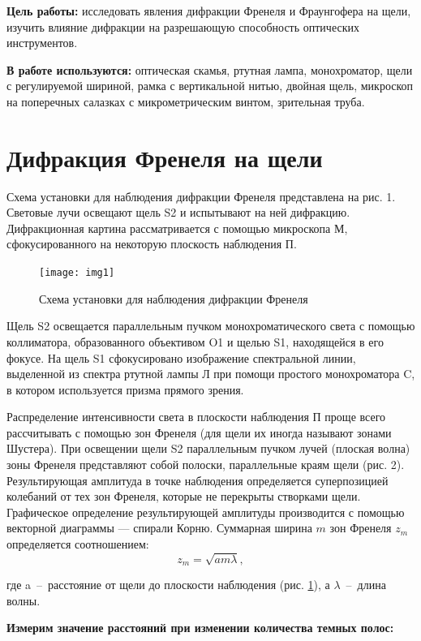 \documentclass{letask}
\begin{document}


\textbf{Цель работы:} исследовать явления дифракции Френеля и Фраунгофера на щели, изучить влияние дифракции на разрешающую способность оптических инструментов.

\textbf{В работе используются:} оптическая скамья, ртутная лампа, монохроматор, щели с регулируемой шириной, рамка с вертикальной нитью, двойная щель, микроскоп на поперечных салазках с микрометрическим винтом, зрительная труба.

\section{Дифракция Френеля на щели}

Схема установки для наблюдения дифракции Френеля представлена на рис. 1. Световые лучи освещают щель S2 и испытывают на ней дифракцию. Дифракционная картина рассматривается с помощью микроскопа М, сфокусированного на некоторую плоскость наблюдения П.

\begin{figure}[H]
\centering
	\texttt{[image: img1]}
	\caption{Схема установки для наблюдения дифракции Френеля}
	\label{fig:scheme}
\end{figure}


Щель S2 освещается параллельным пучком монохроматического света с помощью коллиматора, образованного объективом O1 и щелью S1, находящейся в его фокусе. На щель S1 сфокусировано изображение спектральной линии, выделенной из спектра ртутной лампы Л при помощи простого монохроматора C, в котором используется призма прямого зрения. 

Распределение интенсивности света в плоскости наблюдения П проще всего рассчитывать с помощью зон Френеля (для щели их иногда называют зонами Шустера). При освещении щели S2 параллельным пучком лучей (плоская волна) зоны Френеля представляют собой полоски, параллельные краям щели (рис. 2). Результирующая амплитуда в точке наблюдения определяется суперпозицией колебаний от тех зон Френеля, которые не перекрыты створками щели. Графическое определение результирующей амплитуды производится с помощью векторной диаграммы — спирали Корню. Суммарная ширина $m$ зон Френеля $z_m$ определяется соотношением: 
\[ z_m = \sqrt{am\lambda}, \]

где a~--~расстояние от щели до плоскости наблюдения (рис. \ref{fig:scheme}), а $\lambda$~--~длина волны.

\textbf{Измерим значение расстояний при изменении количества темных полос:}
\end{document}
